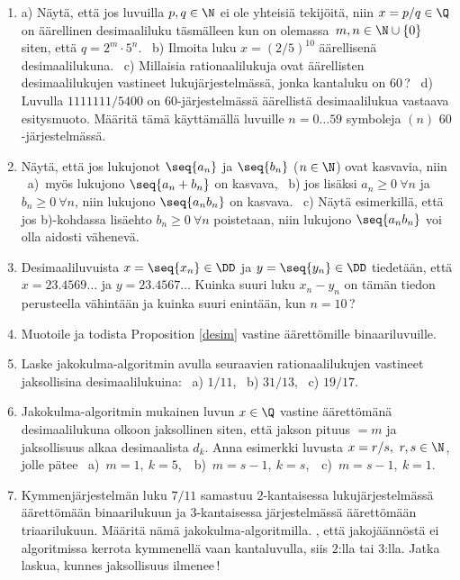 \Harj
\begin{enumerate}

\item
a) Näytä, että jos luvuilla $p,q\in\N$ ei ole yhteisiä tekijöitä, niin $x=p/q\in\Q$ on 
äärellinen desimaaliluku täsmälleen kun on olemassa $\,m,n\in\N\cup\{0\}\,$ siten, että 
$q=2^m \cdot 5^n$. \ b) Ilmoita luku $x=(2/5)^{10}$ äärellisenä desimaalilukuna. \ 
c) Millaisia rationaalilukuja ovat äärellisten desimaalilukujen vastineet
lukujärjestelmässä, jonka kantaluku on $60$\,? \ d) Luvulla $1111111/5400$ on
$60$-järjestelmässä äärellistä desimaalilukua vastaava esitysmuoto. Määritä tämä
käyttämällä luvuille $n=0 \ldots 59$ symboleja $(n)$ $60$-järjestelmässä.

\item \label{H-I-5: monotonisten jonojen yhdistely}
Näytä, että jos lukujonot $\seq{a_n}$ ja $\seq{b_n}$ ($n\in\N$) ovat kasvavia, niin \
\mbox{a) myös} lukujono $\seq{a_n+b_n}$ on kasvava, \ b) jos lisäksi $a_n \ge 0\ \forall n$ ja
$b_n \ge 0\ \forall n$, niin lukujono $\seq{a_n b_n}$ on kasvava. \ c) Näytä esimerkillä,
että jos b)-kohdassa lisäehto $b_n \ge 0\ \forall n$ poistetaan, niin lukujono $\seq{a_n b_n}$
voi olla aidosti vähenevä.

\item
Desimaaliluvuista $x=\seq{x_n}\in\DD$ ja $y=\seq{y_n}\in\DD$ tiedetään, että
$x=23.4569 \ldots$ ja $y=23.4567 \ldots$ Kuinka suuri luku $x_n-y_n$ on tämän tiedon
perusteella vähintään ja kuinka suuri enintään, kun $n=10$\,?

\item
Muotoile ja todista Proposition \ref{desim} vastine äärettömille binaariluvuille.

\item
Laske jakokulma-algoritmin avulla seuraavien rationaalilukujen vastineet jaksollisina 
desimaalilukuina:
\ a) $1/11$, \ b) $31/13$, \ c) $19/17$.

\item
Jakokulma-algoritmin mukainen luvun $x\in\Q$ vastine äärettömänä desimaalilukuna olkoon
jaksollinen siten, että jakson pituus $=m$ ja jaksollisuus alkaa desimaalista $d_k$. Anna 
esimerkki luvusta $x=r/s,\ r,s\in\N$, jolle pätee \ 
a) $\,m=1,\ k=5$, \,\ b) $\,m=s-1,\ k=s$, \,\ c) $\,m=s-1,\ k=1$.

\item
Kymmenjärjestelmän luku $7/11$ samastuu $2$-kantaisessa lukujärjestelmässä äärettömään 
binaarilukuun ja $3$-kantaisessa järjestelmässä äärettömään triaarilukuun. Määritä nämä 
jakokulma-algoritmilla. , että jakojäännöstä ei algoritmissa kerrota kymmenellä vaan
kantaluvulla, siis $2$:lla tai $3$:lla. Jatka laskua, kunnes jaksollisuus ilmenee\,!


\end{enumerate}
